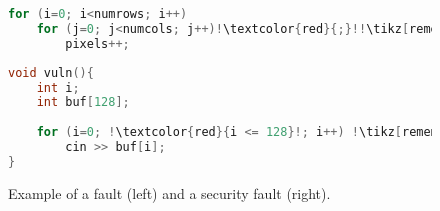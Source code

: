 \begin{figure}[!htbp]
    \centering
    \noindent\begin{minipage}{0.48\textwidth}
        \begin{lstlisting}[language = C, numbers = none, escapechar = !, linewidth=0.9\linewidth, basicstyle = \small, backgroundcolor=\color{lightgray}, frame=tb, caption={Fault example (\textit{cf.} \cite{Jason:2000}).}, captionpos=b, label=bug_ex, numbers=left, stepnumber=1]
for (i=0; i<numrows; i++)
    for (j=0; j<numcols; j++)!\textcolor{red}{;}!!\tikz[remember picture] \node [] (a) {};!
        pixels++;
        \end{lstlisting}
    \end{minipage}
    \begin{minipage}{0.45\textwidth}
        \begin{lstlisting}[language = C++, numbers = none, escapechar = !, linewidth=\linewidth, basicstyle = \small, backgroundcolor=\color{lightgray}, frame=tb, caption={Security fault example (\textit{cf.} \cite{Castro:2016}).}, captionpos=b, label=vuln_ex, numbers=left, stepnumber=1] 
void vuln(){
 	int i;
 	int buf[128];
 	
 	for (i=0; !\textcolor{red}{i <= 128}!; i++) !\tikz[remember picture] \node [] (b){};!
 	    cin >> buf[i];
}
        \end{lstlisting}
    \end{minipage}
    \caption{Example of a fault (left) and a security fault (right).}
    \label{fig:sec_fault_example}
\end{figure}